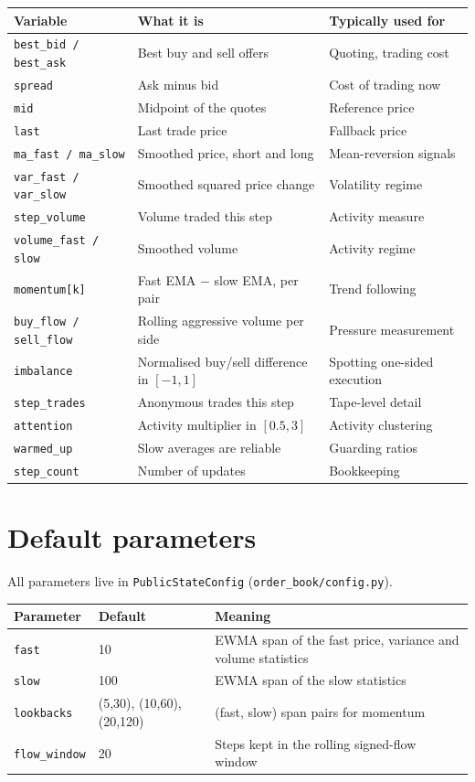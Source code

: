 \documentclass[11pt,a4paper]{article}
\newcommand{\code}[1]{\texttt{#1}}
\begin{document}
\renewcommand{\arraystretch}{1.3}
\begin{center}
\small
\begin{tabular}{@{}L{3.2cm}L{6.4cm}L{5.4cm}@{}}
\toprule
\textbf{Variable} & \textbf{What it is} & \textbf{Typically used for}\\
\midrule
\code{best\_bid / best\_ask} & Best buy and sell offers & Quoting, trading cost\\
\code{spread} & Ask minus bid & Cost of trading now\\
\code{mid} & Midpoint of the quotes & Reference price\\
\code{last} & Last trade price & Fallback price\\
\code{ma\_fast / ma\_slow} & Smoothed price, short and long & Mean-reversion signals\\
\code{var\_fast / var\_slow} & Smoothed squared price change & Volatility regime\\
\code{step\_volume} & Volume traded this step & Activity measure\\
\code{volume\_fast / slow} & Smoothed volume & Activity regime\\
\code{momentum[k]} & Fast EMA $-$ slow EMA, per pair & Trend following\\
\code{buy\_flow / sell\_flow} & Rolling aggressive volume per side & Pressure measurement\\
\code{imbalance} & Normalised buy/sell difference in $[-1,1]$ & Spotting one-sided execution\\
\code{step\_trades} & Anonymous trades this step & Tape-level detail\\
\code{attention} & Activity multiplier in $[0.5,3]$ & Activity clustering\\
\code{warmed\_up} & Slow averages are reliable & Guarding ratios\\
\code{step\_count} & Number of updates & Bookkeeping\\
\bottomrule
\end{tabular}
\end{center}

\section{Default parameters}

All parameters live in \code{PublicStateConfig} (\code{order\_book/config.py}).

\begin{center}
\renewcommand{\arraystretch}{1.25}
\begin{tabular}{@{}L{3.2cm}L{3.2cm}L{7.6cm}@{}}
\toprule
\textbf{Parameter} & \textbf{Default} & \textbf{Meaning}\\
\midrule
\code{fast}        & 10 & EWMA span of the fast price, variance and volume statistics\\
\code{slow}        & 100 & EWMA span of the slow statistics\\
\code{lookbacks}   & (5,30), (10,60), (20,120) & (fast, slow) span pairs for momentum\\
\code{flow\_window}& 20 & Steps kept in the rolling signed-flow window\\
\bottomrule
\end{tabular}
\end{center}
\end{document}

